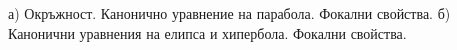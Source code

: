
а) Окръжност. Канонично уравнение на парабола. Фокални свойства.
б) Канонични уравнения на елипса и хипербола. Фокални свойства.